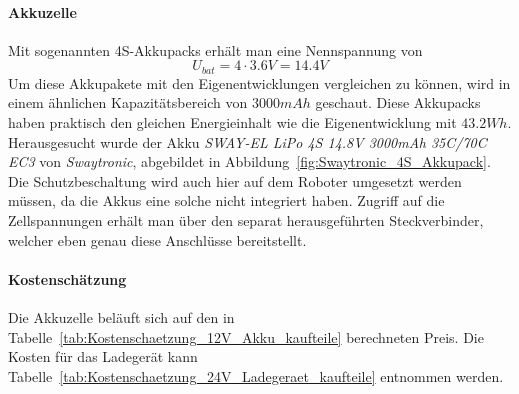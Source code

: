 \documentclass[main.tex]{subfiles} %
\begin{document}
\paragraph{Akkuzelle}

Mit sogenannten 4S-Akkupacks erhält man eine Nennspannung von
\[
    U_{bat} = 4 \cdot 3.6V = 14.4V
\]
Um diese Akkupakete mit den Eigenentwicklungen vergleichen zu können, wird in
einem ähnlichen Kapazitätsbereich von $3000mAh$ geschaut. Diese Akkupacks haben
praktisch den gleichen Energieinhalt wie die Eigenentwicklung mit $43.2Wh$.
Herausgesucht wurde der Akku \textit{SWAY-EL LiPo 4S 14.8V 3000mAh 35C/70C EC3
} von \textit{Swaytronic}, abgebildet in
Abbildung~\ref{fig:Swaytronic_4S_Akkupack}. Die Schutzbeschaltung wird auch
hier auf dem Roboter umgesetzt werden müssen, da die Akkus eine solche nicht
integriert haben. Zugriff auf die Zellspannungen erhält man über den separat
herausgeführten Steckverbinder, welcher eben genau diese Anschlüsse
bereitstellt.

\paragraph{Kostenschätzung}

Die Akkuzelle beläuft sich auf den in
Tabelle~\ref{tab:Kostenschaetzung_12V_Akku_kaufteile} berechneten Preis. Die
Kosten für das Ladegerät kann
Tabelle~\ref{tab:Kostenschaetzung_24V_Ladegeraet_kaufteile} entnommen werden.
\end{document}
